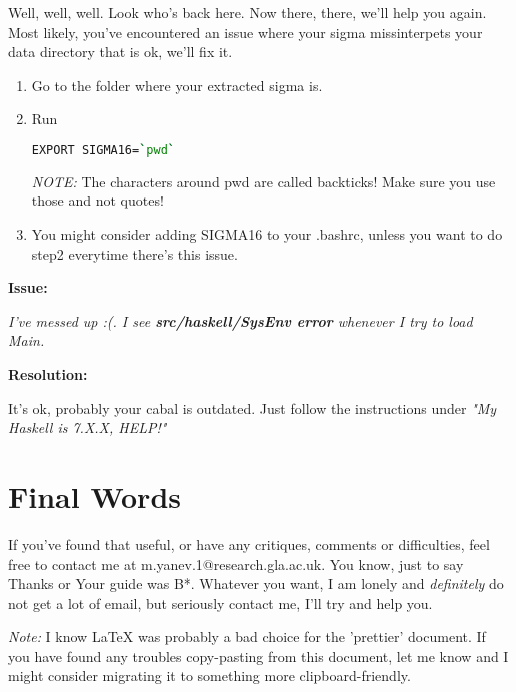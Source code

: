 \documentclass[11pt,a4paper]{article}
\begin{document}
        Well, well, well. Look who's back here. Now there, there, we'll help you again. Most likely, you've encountered an issue where your sigma missinterpets your data directory that is ok, we'll fix it.
        \begin{enumerate}
             
        
        \item Go to the folder where your extracted sigma is.
        \item Run
\begin{lstlisting}[language=Bash]
EXPORT SIGMA16=`pwd`
\end{lstlisting}
        
        \textit{NOTE:} The characters around pwd are called backticks! Make sure you use those and not quotes!
	\item You might consider adding SIGMA16 to your .bashrc, unless you want to do step2 everytime there's this issue.
    \end{enumerate}

 \textbf{Issue:} 
 
 \textit{I've messed up :(. I see \textbf{src/haskell/SysEnv error} whenever I try to load Main.}
 
 \textbf{Resolution:}
 
        It's ok, probably your cabal is outdated. Just follow the instructions under \textit{"My Haskell is 7.X.X, HELP!"}

\section{Final Words}
 If you've found that useful, or have any critiques, comments or difficulties, feel free to contact me at m.yanev.1@research.gla.ac.uk. You know, just to say Thanks or Your guide was B*. Whatever you want, I am lonely and \textit{definitely} do not get a lot of email, but seriously contact me, I'll try and help you.
 
 \textit{Note:}
  I know LaTeX was probably a bad choice for the 'prettier' document. If you have found any troubles copy-pasting from this document, let me know and I might consider migrating it to something more clipboard-friendly.
\end{document}
